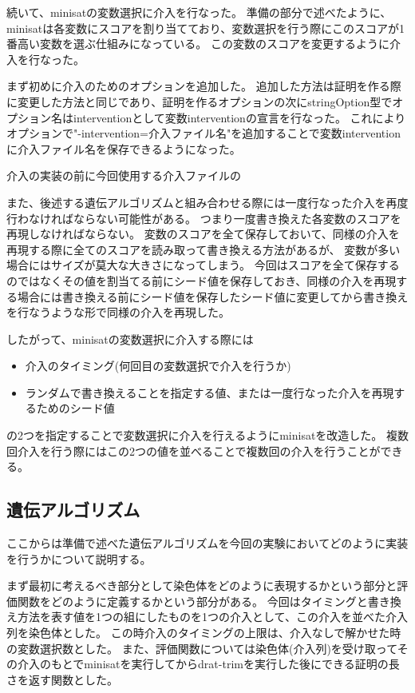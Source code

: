 \documentclass[titlepage]{jsarticle}
\begin{document}




続いて、minisatの変数選択に介入を行なった。
準備の部分で述べたように、minisatは各変数にスコアを割り当てており、変数選択を行う際にこのスコアが1番高い変数を選ぶ仕組みになっている。
この変数のスコアを変更するように介入を行なった。

まず初めに介入のためのオプションを追加した。
追加した方法は証明を作る際に変更した方法と同じであり、証明を作るオプションの次にstringOption型でオプション名はinterventionとして変数interventionの宣言を行なった。
これによりオプションで"-intervention=介入ファイル名"を追加することで変数interventionに介入ファイル名を保存できるようになった。

介入の実装の前に今回使用する介入ファイルの

また、後述する遺伝アルゴリズムと組み合わせる際には一度行なった介入を再度行わなければならない可能性がある。
つまり一度書き換えた各変数のスコアを再現しなければならない。
変数のスコアを全て保存しておいて、同様の介入を再現する際に全てのスコアを読み取って書き換える方法があるが、
変数が多い場合にはサイズが莫大な大きさになってしまう。
今回はスコアを全て保存するのではなくその値を割当てる前にシード値を保存しておき、同様の介入を再現する場合には書き換える前にシード値を保存したシード値に変更してから書き換えを行なうような形で同様の介入を再現した。

したがって、minisatの変数選択に介入する際には
\begin{itemize}
	\item 介入のタイミング(何回目の変数選択で介入を行うか)
	\item ランダムで書き換えることを指定する値、または一度行なった介入を再現するためのシード値
\end{itemize}
の2つを指定することで変数選択に介入を行えるようにminisatを改造した。
複数回介入を行う際にはこの2つの値を並べることで複数回の介入を行うことができる。





\subsection{遺伝アルゴリズム}



ここからは準備で述べた遺伝アルゴリズムを今回の実験においてどのように実装を行うかについて説明する。

まず最初に考えるべき部分として染色体をどのように表現するかという部分と評価関数をどのように定義するかという部分がある。
今回はタイミングと書き換え方法を表す値を1つの組にしたものを1つの介入として、この介入を並べた介入列を染色体とした。
この時介入のタイミングの上限は、介入なしで解かせた時の変数選択数とした。
また、評価関数については染色体(介入列)を受け取ってその介入のもとでminisatを実行してからdrat-trimを実行した後にできる証明の長さを返す関数とした。
\end{document}
